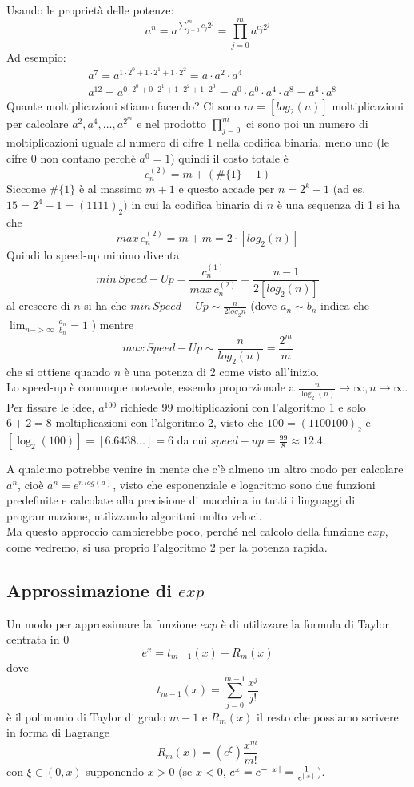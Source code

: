 \documentclass[12pt]{article}
\DeclarePairedDelimiter{\abs}{\lvert}{\rvert}
\begin{document}
\bigskip
Usando le proprietà delle potenze:
\[ a^n=a^{\sum_{j=0}^{m} c_j 2^j}=\prod_{j=0}^{m} a^{c_j 2^j} \]
Ad esempio:
\[\begin{split}
	& a^7=a^{1\cdot 2^0 + 1\cdot 2^1 + 1\cdot 2^2}=a\cdot a^2\cdot a^4 \\
	& a^{12}=a^{0\cdot 2^0+0\cdot 2^1+1\cdot 2^2+1\cdot 2^3} = a^0\cdot a^0\cdot a^4\cdot a^8 =a^4\cdot a^8 
\end{split}\]
Quante moltiplicazioni stiamo facendo? Ci sono $m=[log_{2}(n)]$ moltiplicazioni per calcolare $a^2 , a^4 , \dotsc , a^{2^m}$ e nel prodotto $\prod_{j=0}^m$ ci sono poi un numero di moltiplicazioni uguale al numero di cifre 1 nella codifica binaria, meno uno (le cifre 0 non contano perchè $a^0=1$) quindi il costo totale è \[c_n^{(2)}=m+(\#\{1\}-1)\]
Siccome $\#\{1\}$ è al massimo $m+1$ e questo accade per $n=2^k-1$ (ad es. $15=2^4-1=(1111)_2)$ in cui la codifica binaria di $n$ è una sequenza di 1 si ha che
\[max\,c_n^{(2)} = m+m = 2\cdot [log_2(n)]\]
Quindi lo speed-up minimo diventa
\[min\,Speed-Up=\frac{c^{(1)}_n}{max\,c^{(2)}_n} = \frac{n-1}{2[log_2(n)]}\]
al crescere di $n$ si ha che $min\,Speed-Up \sim \frac{n}{2log_{2}n}$ (dove $a_n \sim b_n$ indica che $\lim_{n->\infty} \frac{a_n}{b_n}=1$ ) mentre 
\[max\,Speed-Up \sim \frac{n}{log_{2}(n)} = \frac{2^m}{m}\]
che si ottiene quando $n$ è una potenza di 2 come visto all'inizio. \\
Lo speed-up è comunque notevole, essendo proporzionale a $\frac{n}{\log_2(n)} \to \infty, n\to \infty$. \\
Per fissare le idee, $a^{100}$ richiede $99$ moltiplicazioni con l'algoritmo 1 e solo $6+2=8$ moltiplicazioni con l'algoritmo 2, visto che $100=(1100100)_2$ e $[\log_2(100)]=[6.6438\dotsc]=6$ da cui $speed-up=\frac{99}{8}\approx 12.4$.

\bigskip
A qualcuno potrebbe venire in mente che c'è almeno un altro modo per calcolare $a^n$, cioè $a^n=e^{n\,log(a)}$, visto che esponenziale e logaritmo sono due funzioni predefinite e calcolate alla precisione di macchina in tutti i linguaggi di programmazione, utilizzando algoritmi molto veloci. \\
Ma questo approccio cambierebbe poco, perché nel calcolo della funzione $exp$, come vedremo, si usa proprio l'algoritmo 2 per la potenza rapida.

\subsection{Approssimazione di $exp$}
Un modo per approssimare la funzione $exp$ è di utilizzare la formula di Taylor centrata in 0
\[e^x=t_{m-1}(x)+R_m(x)\]
dove 
\[t_{m-1}(x)=\sum_{j=0}^{m-1}\frac{x^j}{j!}\]
è il polinomio di Taylor di grado $m-1$ e $R_m(x)$ il resto che possiamo scrivere in forma di Lagrange
\[R_m(x)=(e^{\xi})\frac{x^m}{m!}\]
con $\xi\in(0,x) $ supponendo $x>0$ (se $x<0$, $e^x=e^{-\abs{\,x\,}}=\frac{1}{e^{\abs{\,x\,}}}$).\\
\end{document}

